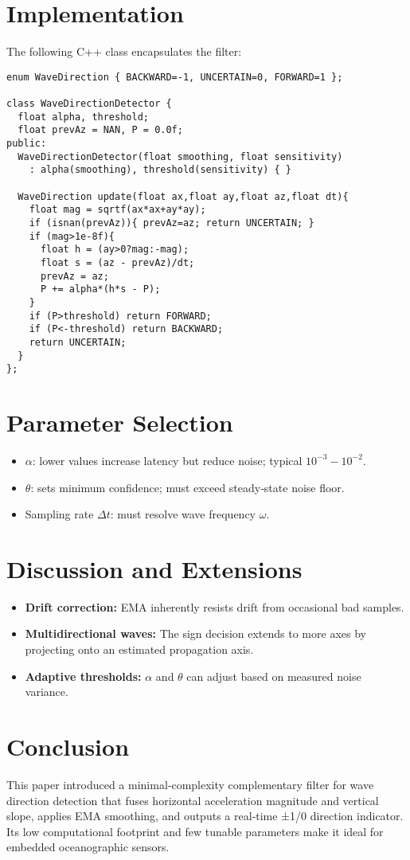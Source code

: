 \documentclass[12pt]{article}
\begin{document}
\section{Implementation}
The following C++ class encapsulates the filter:

\begin{verbatim}
enum WaveDirection { BACKWARD=-1, UNCERTAIN=0, FORWARD=1 };

class WaveDirectionDetector {
  float alpha, threshold;
  float prevAz = NAN, P = 0.0f;
public:
  WaveDirectionDetector(float smoothing, float sensitivity)
    : alpha(smoothing), threshold(sensitivity) { }

  WaveDirection update(float ax,float ay,float az,float dt){
    float mag = sqrtf(ax*ax+ay*ay);
    if (isnan(prevAz)){ prevAz=az; return UNCERTAIN; }
    if (mag>1e-8f){
      float h = (ay>0?mag:-mag);
      float s = (az - prevAz)/dt;
      prevAz = az;
      P += alpha*(h*s - P);
    }
    if (P>threshold) return FORWARD;
    if (P<-threshold) return BACKWARD;
    return UNCERTAIN;
  }
};
\end{verbatim}

\section{Parameter Selection}
\begin{itemize}
  \item \(\alpha\): lower values increase latency but reduce noise; typical \(10^{-3}\!-\!10^{-2}\).
  \item \(\theta\): sets minimum confidence; must exceed steady‐state noise floor.
  \item Sampling rate \(\Delta t\): must resolve wave frequency \(\omega\).
\end{itemize}

\section{Discussion and Extensions}
\begin{itemize}
  \item \textbf{Drift correction:} EMA inherently resists drift from occasional bad samples.
  \item \textbf{Multidirectional waves:} The sign decision extends to more axes by projecting onto an estimated propagation axis.
  \item \textbf{Adaptive thresholds:} \(\alpha\) and \(\theta\) can adjust based on measured noise variance.
\end{itemize}

\section{Conclusion}
This paper introduced a minimal‐complexity complementary filter for wave direction detection that fuses horizontal acceleration magnitude and vertical slope, applies EMA smoothing, and outputs a real‐time ±1/0 direction indicator.  Its low computational footprint and few tunable parameters make it ideal for embedded oceanographic sensors.
\end{document}
